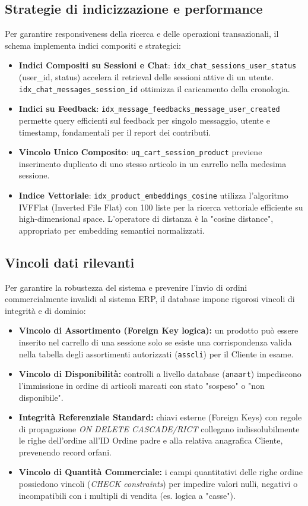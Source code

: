 \documentclass[a4paper, 11pt, oneside]{scrartcl}
\begin{document}
\subsection{Strategie di indicizzazione e performance}
Per garantire responsiveness della ricerca e delle operazioni transazionali, il schema implementa indici compositi e strategici:
\begin{itemize}
    \item \textbf{Indici Compositi su Sessioni e Chat}: \texttt{idx\_chat\_sessions\_user\_status} (user\_id, status) accelera il retrieval delle sessioni attive di un utente. \texttt{idx\_chat\_messages\_session\_id} ottimizza il caricamento della cronologia.
    \item \textbf{Indici su Feedback}: \texttt{idx\_message\_feedbacks\_message\_user\_created} permette query efficienti sul feedback per singolo messaggio, utente e timestamp, fondamentali per il report dei contributi.
    \item \textbf{Vincolo Unico Composito}: \texttt{uq\_cart\_session\_product} previene inserimento duplicato di uno stesso articolo in un carrello nella medesima sessione.
    \item \textbf{Indice Vettoriale}: \texttt{idx\_product\_embeddings\_cosine} utilizza l'algoritmo IVFFlat (Inverted File Flat) con 100 liste per la ricerca vettoriale efficiente su high-dimensional space. L'operatore di distanza è la "cosine distance", appropriato per embedding semantici normalizzati.
\end{itemize}

\subsection{Vincoli dati rilevanti}
Per garantire la robustezza del sistema e prevenire l'invio di ordini commercialmente invalidi al sistema ERP, il database impone rigorosi vincoli di integrità e di dominio:
\begin{itemize}
    \item \textbf{Vincolo di Assortimento (Foreign Key logica):} un prodotto può essere inserito nel carrello di una sessione solo se esiste una corrispondenza valida nella tabella degli assortimenti autorizzati (\texttt{asscli}) per il Cliente in esame.
    \item \textbf{Vincolo di Disponibilità:} controlli a livello database (\texttt{anaart}) impediscono l'immissione in ordine di articoli marcati con stato "sospeso" o "non disponibile".
    \item \textbf{Integrità Referenziale Standard:} chiavi esterne (Foreign Keys) con regole di propagazione \textit{ON DELETE CASCADE/RICT} collegano indissolubilmente le righe dell'ordine all'ID Ordine padre e alla relativa anagrafica Cliente, prevenendo record orfani.
    \item \textbf{Vincolo di Quantità Commerciale:} i campi quantitativi delle righe ordine possiedono vincoli (\textit{CHECK constraints}) per impedire valori nulli, negativi o incompatibili con i multipli di vendita (es. logica a "casse").
\end{itemize}
\end{document}
